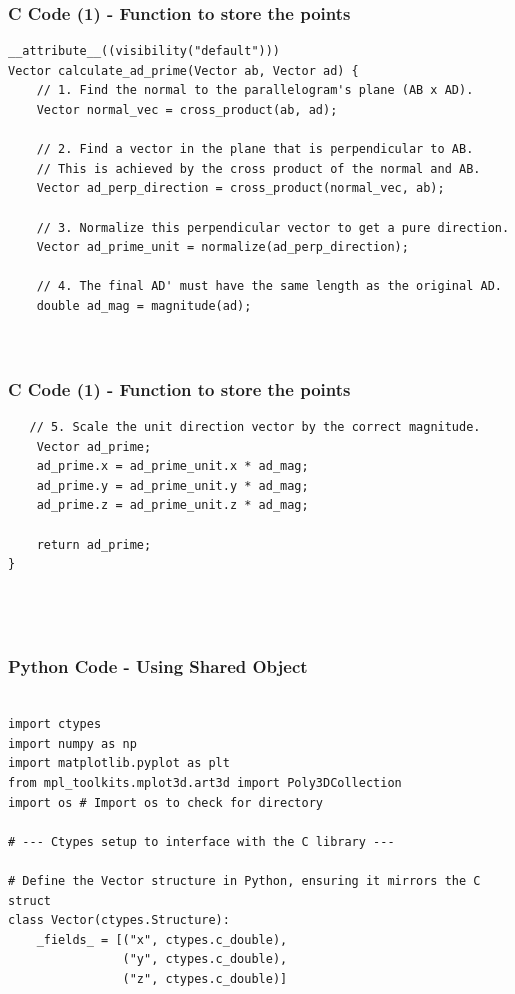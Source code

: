 \documentclass{beamer}
\begin{document}
\begin{frame}[fragile]
    \frametitle{C Code (1) - Function to store the points }

    \begin{lstlisting}
__attribute__((visibility("default")))
Vector calculate_ad_prime(Vector ab, Vector ad) {
    // 1. Find the normal to the parallelogram's plane (AB x AD).
    Vector normal_vec = cross_product(ab, ad);

    // 2. Find a vector in the plane that is perpendicular to AB.
    // This is achieved by the cross product of the normal and AB.
    Vector ad_perp_direction = cross_product(normal_vec, ab);

    // 3. Normalize this perpendicular vector to get a pure direction.
    Vector ad_prime_unit = normalize(ad_perp_direction);

    // 4. The final AD' must have the same length as the original AD.
    double ad_mag = magnitude(ad);

 
    \end{lstlisting}
\end{frame}

\begin{frame}[fragile]
    \frametitle{C Code (1) - Function to store the points }

    \begin{lstlisting}
   // 5. Scale the unit direction vector by the correct magnitude.
    Vector ad_prime;
    ad_prime.x = ad_prime_unit.x * ad_mag;
    ad_prime.y = ad_prime_unit.y * ad_mag;
    ad_prime.z = ad_prime_unit.z * ad_mag;
    
    return ad_prime;
}




    \end{lstlisting}
\end{frame}


\begin{frame}[fragile]
    \frametitle{Python Code - Using Shared Object}
    \begin{lstlisting}

import ctypes
import numpy as np
import matplotlib.pyplot as plt
from mpl_toolkits.mplot3d.art3d import Poly3DCollection
import os # Import os to check for directory

# --- Ctypes setup to interface with the C library ---

# Define the Vector structure in Python, ensuring it mirrors the C struct
class Vector(ctypes.Structure):
    _fields_ = [("x", ctypes.c_double),
                ("y", ctypes.c_double),
                ("z", ctypes.c_double)]


\end{lstlisting}
\end{frame}
\end{document}
